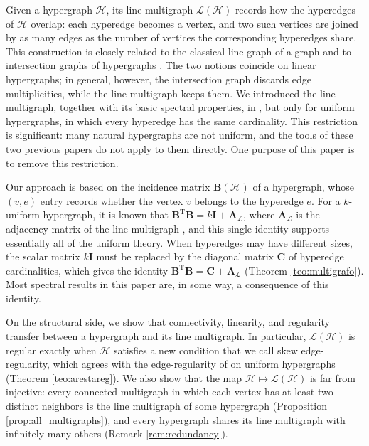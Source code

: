 \documentclass[12pt,reqno]{amsart}
\begin{document}
Given a hypergraph $\mathcal{H}$, its line multigraph $\mathcal{L}(\mathcal{H})$ records how the hyperedges of $\mathcal{H}$ overlap: each hyperedge becomes a vertex, and two such vertices are joined by as many edges as the number of vertices the corresponding hyperedges share. This construction is closely related to the classical line graph of a graph \cite{line-1,line-1932,line-0} and to intersection graphs of hypergraphs \cite{line-3-uniform, line-survei-arx, line, line-survei}. The two notions coincide on linear hypergraphs; in general, however, the intersection graph discards edge multiplicities, while the line multigraph keeps them. We introduced the line multigraph, together with its basic spectral properties, in \cite{kaue-energia,kaue-lap}, but only for uniform hypergraphs, in which every hyperedge has the same cardinality. This restriction is significant: many natural hypergraphs are not uniform, and the tools of these two previous papers do not apply to them directly. One purpose of this paper is to remove this restriction.

Our approach is based on the incidence matrix $\mathbf{B}(\mathcal{H})$ of a hypergraph, whose $(v,e)$ entry records whether the vertex $v$ belongs to the hyperedge $e$. For a $k$-uniform hypergraph, it is known that $\mathbf{B}^\mathrm{T}\mathbf{B} = k\mathbf{I} + \mathbf{A}_{\mathcal{L}}$, where $\mathbf{A}_{\mathcal{L}}$ is the adjacency matrix of the line multigraph \cite{kaue-lap}, and this single identity supports essentially all of the uniform theory. When hyperedges may have different sizes, the scalar matrix $k\mathbf{I}$ must be replaced by the diagonal matrix $\mathbf{C}$ of hyperedge cardinalities, which gives the identity $\mathbf{B}^\mathrm{T}\mathbf{B} = \mathbf{C} + \mathbf{A}_{\mathcal{L}}$ (Theorem \ref{teo:multigrafo}). Most spectral results in this paper are, in some way, a consequence of this identity.

On the structural side, we show that connectivity, linearity, and regularity transfer between a hypergraph and its line multigraph. In particular, $\mathcal{L}(\mathcal{H})$ is regular exactly when $\mathcal{H}$ satisfies a new condition that we call skew edge-regularity, which agrees with the edge-regularity of \cite{kaue-sign-vector} on uniform hypergraphs (Theorem \ref{teo:arestareg}). We also show that the map $\mathcal{H} \mapsto \mathcal{L}(\mathcal{H})$ is far from injective: every connected multigraph in which each vertex has at least two distinct neighbors is the line multigraph of some hypergraph (Proposition \ref{prop:all_multigraphs}), and every hypergraph shares its line multigraph with infinitely many others (Remark \ref{rem:redundancy}).
\end{document}
